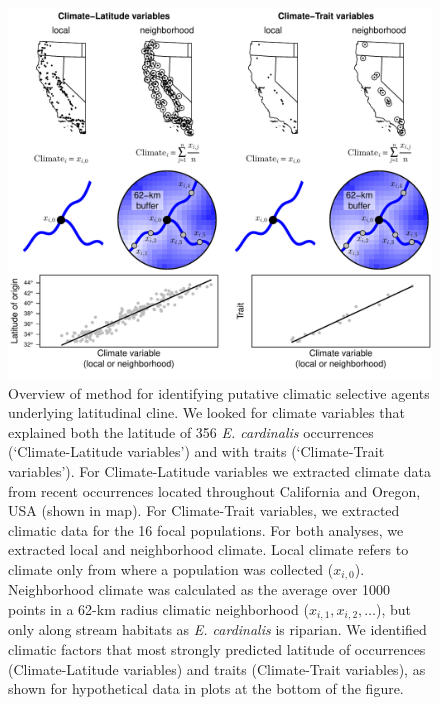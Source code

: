 \documentclass[11pt, oneside]{article}
\begin{document}
\begin{figure}[h!]
	\centerline{\includegraphics[width=1\textwidth]{Figures/Figure_VarSelect.pdf}}
	\fontsize{10}{12}
	\selectfont
	\caption[Climatic variable selection]{Overview of method for identifying putative climatic selective agents underlying latitudinal cline. We looked for climate variables that explained both the latitude of 356 \textit{E. cardinalis} occurrences (`Climate-Latitude variables') and with traits (`Climate-Trait variables'). For Climate-Latitude variables we extracted climate data from recent occurrences located throughout California and Oregon, USA (shown in map). For Climate-Trait variables, we extracted climatic data for the 16 focal populations. For both analyses, we extracted local and neighborhood climate. Local climate refers to climate only from where a population was collected ($x_{i,0}$). Neighborhood climate was calculated as the average over 1000 points in a 62-km radius climatic neighborhood ($x_{i,1}, x_{i,2}, \dots$), but only along stream habitats as \textit{E. cardinalis} is riparian. We identified climatic factors that most strongly predicted latitude of occurrences (Climate-Latitude variables) and traits (Climate-Trait variables), as shown for hypothetical data in plots at the bottom of the figure.}
	\label{fig:Fig_VarSelect}
\end{figure}
\end{document}

